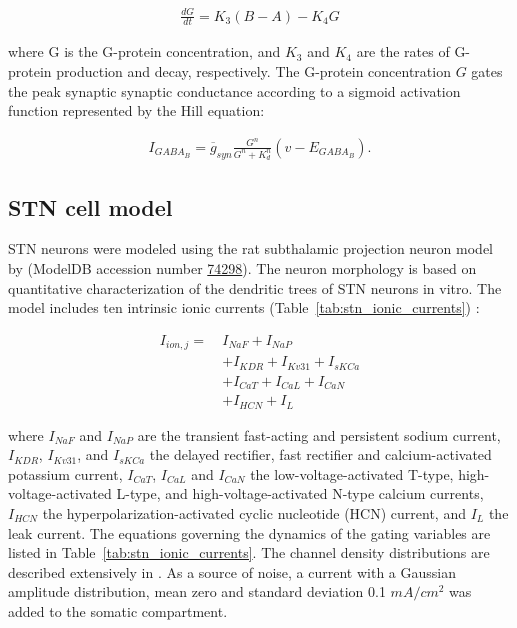 \begin{align}
    \frac{dG}{dt} = K_3 (B-A) - K_4 G
\end{align}

where G is the G-protein concentration, and $K_3$ and $K_4$ are the rates of G-protein production and decay, respectively. The G-protein concentration $G$ gates the peak synaptic synaptic conductance according to a sigmoid activation function represented by the Hill equation:

\begin{align}
    I_{GABA_B} = \overline{g}_{syn} \tfrac{G^n}{G^n + K_d^n} (v - E_{GABA_B}).
    \label{eq:gabab-synapse-end}
\end{align}

%
\subsection{STN cell model}

STN neurons were modeled using the rat subthalamic projection neuron model by \cite{gillies_membrane_2005} (ModelDB accession number \href{https://senselab.med.yale.edu/ModelDB/showmodel.cshtml?model=74298}{74298}). The neuron morphology is based on quantitative characterization of the dendritic trees of STN neurons in vitro. The model includes ten intrinsic ionic currents (Table~\ref{tab:stn_ionic_currents}) :

\begin{equation}
\begin{split}
    I_{ion,j} = \ & I_{NaF} + I_{NaP} \\
              & + I_{KDR} + I_{Kv31} + I_{sKCa} \\
              & + I_{CaT} + I_{CaL} + I_{CaN} \\
              & + I_{HCN} + I_{L}
\end{split}
\end{equation}

where $I_{NaF}$ and $I_{NaP}$ are the transient fast-acting and persistent sodium current, $I_{KDR}$, $I_{Kv31}$, and $I_{sKCa}$ the delayed rectifier, fast rectifier and calcium-activated potassium current, $I_{CaT}$, $I_{CaL}$ and  $I_{CaN}$ the low-voltage-activated T-type, high-voltage-activated L-type, and high-voltage-activated N-type calcium currents, $I_{HCN}$ the hyperpolarization-activated cyclic nucleotide (HCN) current, and $I_{L}$ the leak current. The equations governing the dynamics of the gating variables are listed in Table~\ref{tab:stn_ionic_currents}. The channel density distributions are described extensively in \cite{gillies_membrane_2005}.
%
As a source of noise, a current with a Gaussian amplitude distribution, mean zero and
standard deviation 0.1 $mA/cm^2$ was added to the somatic compartment.

